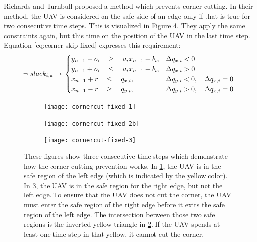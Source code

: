 Richards and Turnbull\cite{Richards2015} proposed a method which prevents corner cutting. In their method, the UAV is considered on the safe side of an edge only if that is true for two consecutive time steps.  This is visualized in Figure \ref{fig:cc-fixed}. They apply the same constraints again, but this time on the position of the UAV in the last time step. Equation \ref{eq:corner-skip-fixed} expresses this requirement:
\begin{equation}
\label{eq:corner-skip-fixed}
\neg ~ slack_{i,n} \rightarrow \\
\begin{cases}
y_{n-1} -  o_i \quad \geq 
\quad a_{i} x_{n-1} + b_{i},  	
& \Delta q_{x,i} < 0 							 	
 \\
y_{n-1} + o_i \quad \leq 
\quad a_{i} x_{n-1} + b_{i},
& \Delta q_{x,i} > 0 							 	
 \\
x_{n-1} + r \quad \leq
\quad  q_{x,i}, 		
& \Delta q_{y,i} < 0, \quad \Delta q_{x,i} = 0 	
 \\
x_{n-1} - r \quad \geq 
\quad q_{y,i},  		
& \Delta q_{y,i} > 0, \quad \Delta q_{x,i} = 0 	
\end{cases}
\end{equation}
\begin{figure}
	\centering
	\begin{subfigure}[t]{0.3\columnwidth}
        		\texttt{[image: cornercut-fixed-1]}
        		\caption{}
        		\label{fig:cc-fixed-1}
	\end{subfigure}
	\hfil
	\begin{subfigure}[t]{0.3\columnwidth}
        		\texttt{[image: cornercut-fixed-2b]}
        		\caption{}
        		 \label{fig:cc-fixed-2}
	\end{subfigure}	
		\hfil
	\begin{subfigure}[t]{0.3\columnwidth}
        		\texttt{[image: cornercut-fixed-3]}
        		\caption{}
        		\label{fig:cc-fixed-3}
	\end{subfigure}
    \caption[A visual demonstration of how the corner cutting prevention works.]{These figures show three consecutive time steps which demonstrate how the corner cutting prevention works. In \ref{fig:cc-fixed-1}, the UAV is in the safe region of the left edge (which is indicated by the yellow color). In \ref{fig:cc-fixed-3}, the UAV is in the safe region for the right edge, but not the left edge. To ensure that the UAV does not cut the corner, the UAV must enter the safe region of the right edge before it exits the safe region of the left edge. The intersection between those two safe regions is the inverted yellow triangle in \ref{fig:cc-fixed-2}. If the UAV spends at least one time step in that yellow, it cannot cut the corner.}
    \label{fig:cc-fixed}     
\end{figure}

